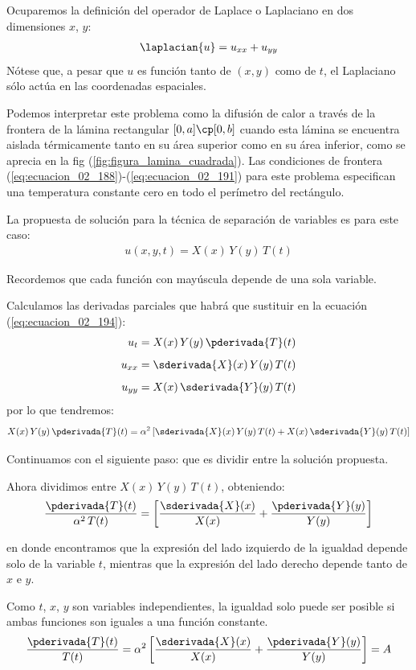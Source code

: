 Ocuparemos la definición del operador de Laplace o Laplaciano en dos dimensiones $x$, $y$:
\begin{align}
\laplacian{u} = u_{xx} + u_{yy}
\label{eq:ecuacion_02_193}
\end{align}
Nótese que, a pesar que $u$ es función tanto de $(x, y) $ como de $t$, el Laplaciano sólo actúa en las coordenadas espaciales.
\par
Podemos interpretar este problema como la difusión de calor a través de la frontera de la lámina rectangular $[0, a] \cp [0, b]$ cuando esta lámina se encuentra aislada térmicamente tanto en su área superior como en su área inferior, como se aprecia en la fig (\ref{fig:figura_lamina_cuadrada}). Las condiciones de frontera (\ref{eq:ecuacion_02_188})-(\ref{eq:ecuacion_02_191}) para este problema especifican una temperatura constante cero en todo el perímetro del rectángulo.
\par
La propuesta de solución para la técnica de separación de variables es para este caso:
\begin{align}
u (x, y, t) = X (x) \, Y (y) \, T (t)
\label{eq:ecuacion_02_194}
\end{align}

Recordemos que cada función con mayúscula depende de una sola variable.
\par
Calculamos las derivadas parciales que habrá que sustituir en la ecuación (\ref{eq:ecuacion_02_194}):
\begin{align*}
u_{t} &= X (x) \, Y (y) \, \pderivada{T} (t) \\[0.5em]
u_{xx} &= \sderivada{X} (x) \, Y (y) \, T (t) \\[0.5em]
u_{yy} &= X (x) \, \sderivada{Y} (y) \, T (t)
\end{align*}
por lo que tendremos:
\begin{align*}
X (x) \, Y (y) \, \pderivada{T} (t) = \alpha^{2} \left[ \sderivada{X} (x) \, Y (y) \, T (t) + X (x) \, \sderivada{Y} (y) \, T (t) \right]
\end{align*}

Continuamos con el siguiente paso: que es dividir entre la solución propuesta.
\par
Ahora dividimos entre $X (x) \, Y (y) \, T (t)$, obteniendo:
\begin{align*}
\dfrac{\pderivada{T} (t)}{\alpha^{2}  \, T (t)} = \left[ \dfrac{\sderivada{X} (x)}{X (x)} + \dfrac{\pderivada{Y} (y)}{Y (y)} \right]
\end{align*}

en donde encontramos que la expresión del lado izquierdo de la igualdad depende solo de la variable $t$, mientras que la expresión del lado derecho depende tanto de $x$ e $y$.
\par
Como $t$, $x$, $y$ son variables independientes, la igualdad solo puede ser posible si ambas funciones son iguales a una función constante.
\begin{align*}
\dfrac{\pderivada{T} (t) }{T (t)} =  \alpha^{2} \left[ \dfrac{\sderivada{X} (x)}{X (x)} + \dfrac{\pderivada{Y} (y)}{Y (y)} \right] = A
\end{align*}

